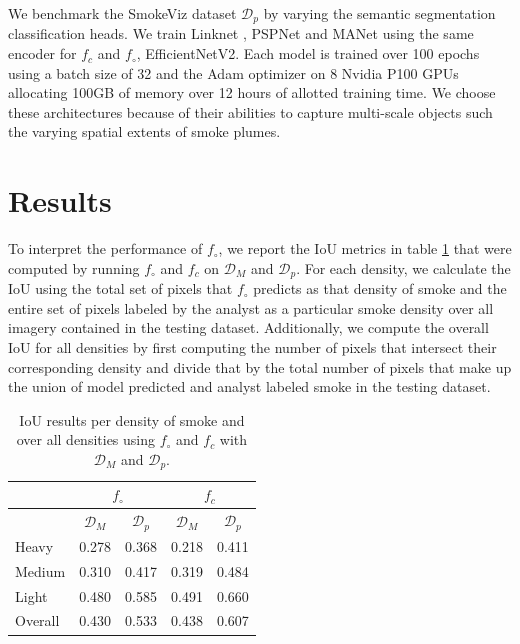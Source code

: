 \documentclass{article}
\begin{document}
We benchmark the SmokeViz dataset \(\mathcal{D}_{p}\) by varying the semantic segmentation classification heads. We train Linknet \cite{linknet}, PSPNet \cite{pspnet} and MANet \cite{manet} using the same encoder for \(f_c\) and \(f_{\circ}\), EfficientNetV2. Each model is trained over 100 epochs using a batch size of 32 and the Adam optimizer on 8 Nvidia P100 GPUs allocating 100GB of memory over 12 hours of allotted training time. We choose these architectures because of their abilities to capture multi-scale objects such the varying spatial extents of smoke plumes.

\section{Results}

To interpret the performance of \(f_{\circ}\), we report the IoU metrics in table \ref{iou_results} that were computed by running \(f_{\circ}\) and \(f_c\) on \(\mathcal{D}_M\) and \(\mathcal{D}_{p}\). For each density, we calculate the IoU using the total set of pixels that \(f_{\circ}\) predicts as that density of smoke and the entire set of pixels labeled by the analyst as a particular smoke density over all imagery contained in the testing dataset. Additionally, we compute the overall IoU for all densities by first computing the number of pixels that intersect their corresponding density and divide that by the total number of pixels that make up the union of model predicted and analyst labeled smoke in the testing dataset.

\begin{table} 
    \caption{IoU results per density of smoke and over all densities using \(f_{\circ}\) and \(f_c\) with \(\mathcal{D}_M\) and \(\mathcal{D}_p\).}\label{iou_results}
    \centering
    \begin{tabular}{lcc|cc}
        \toprule
        \multicolumn{1}{c}{} & \multicolumn{2}{c}{\(f_{\circ}\)} & \multicolumn{2}{c}{\(f_c\)}\\
        \midrule
        \multicolumn{1}{c}{} & \(\mathcal{D}_M\) & \(\mathcal{D}_{p}\) & \(\mathcal{D}_M\) & \(\mathcal{D}_{p}\) \\
        \midrule
        Heavy   & 0.278 & 0.368 & 0.218 &  0.411 \\
        Medium  & 0.310 & 0.417 & 0.319 &  0.484 \\
        Light   & 0.480 & 0.585 & 0.491 &  0.660 \\
        Overall & 0.430 & 0.533 & 0.438 &  0.607 \\
        \bottomrule
    \end{tabular}
\end{table}
\end{document}
